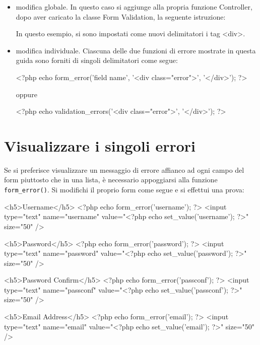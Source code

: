 \begin{itemize}
\item modifica globale. In questo caso si aggiunge alla propria funzione Controller, dopo aver caricato la classe Form Validation, la seguente istruzione:


In questo esempio, si sono impostati come nuovi delimitatori i tag <div>.

\item modifica individuale. Ciascuna delle due funzioni di errore mostrate in questa guida sono forniti di singoli delimitatori come segue:

\begin{code}
<?php echo form_error('field name', '<div class="error">', '</div>'); ?>
\end{code}

oppure

\begin{code}
<?php echo validation_errors('<div class="error">', '</div>'); ?>
\end{code}
\end{itemize}

\section*{Visualizzare i singoli errori}
Se si preferisce visualizzare un messaggio di errore affianco ad ogni campo del form piuttosto che in una lista, è necessario appoggiarsi alla funzione \verb|form_error()|. Si modifichi il proprio form come segue e si effettui una prova:

\begin{code}
<h5>Username</h5>
<?php echo form_error('username'); ?>
<input type="text" name="username" value="<?php echo set_value('username'); ?>" size="50" />

<h5>Password</h5>
<?php echo form_error('password'); ?>
<input type="text" name="password" value="<?php echo set_value('password'); ?>" size="50" />

<h5>Password Confirm</h5>
<?php echo form_error('passconf'); ?>
<input type="text" name="passconf" value="<?php echo set_value('passconf'); ?>" size="50" />

<h5>Email Address</h5>
<?php echo form_error('email'); ?>
<input type="text" name="email" value="<?php echo set_value('email'); ?>" size="50" />
\end{code}

